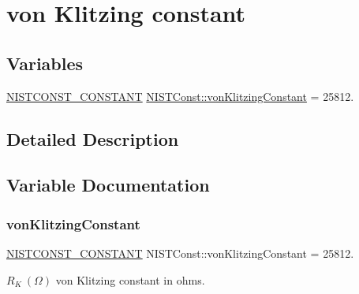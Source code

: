 \hypertarget{group___n_i_s_t_const-von_klitzing_constant}{}\section{von Klitzing constant}
\label{group___n_i_s_t_const-von_klitzing_constant}
\subsection*{Variables}
\begin{DoxyCompactItemize}
\item 
\mbox{\hyperlink{group___n_i_s_t_const-_macros_ga2b0fc1d7452373f816175dd86ce26729}{N\+I\+S\+T\+C\+O\+N\+S\+T\+\_\+\+C\+O\+N\+S\+T\+A\+NT}} \mbox{\hyperlink{group___n_i_s_t_const-von_klitzing_constant_ga1807b35d7b414619c32937c946fe16ed}{N\+I\+S\+T\+Const\+::von\+Klitzing\+Constant}} = 25812.
\end{DoxyCompactItemize}


\subsection{Detailed Description}


\subsection{Variable Documentation}
\mbox{\label{group___n_i_s_t_const-von_klitzing_constant_ga1807b35d7b414619c32937c946fe16ed}} 
\subsubsection{\texorpdfstring{von\+Klitzing\+Constant}{vonKlitzingConstant}}
{\footnotesize\ttfamily \mbox{\hyperlink{group___n_i_s_t_const-_macros_ga2b0fc1d7452373f816175dd86ce26729}{N\+I\+S\+T\+C\+O\+N\+S\+T\+\_\+\+C\+O\+N\+S\+T\+A\+NT}} N\+I\+S\+T\+Const\+::von\+Klitzing\+Constant = 25812.}

$R_K \ (\Omega)$ von Klitzing constant in ohms. 